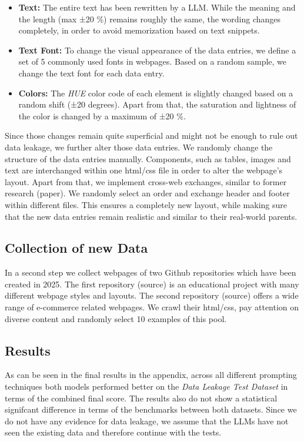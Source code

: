 \begin{itemize}
  \item \textbf{Text:} The entire text has been rewritten by a LLM. While the meaning
    and the length (max ±20 \%) remains roughly the same, the wording changes
    completely, in order to avoid memorization based on text snippets.
  \item \textbf{Text Font:} To change the visual appearance of the data entries, we 
    define a set of 5 commonly used fonts in webpages. Based on a random sample, we 
    change the text font for each data entry.
  \item \textbf{Colors:} The \textit{HUE} color code of each element is slightly
    changed based on a random shift (±20 degrees). Apart from that, the saturation
    and lightness of the color is changed by a maximum of ±20 \%.
\end{itemize}

Since those changes remain quite superficial and might not be enough to rule out 
data leakage, we further alter those data entries. We randomly change the structure 
of the data entries manually. Components, such as tables, images and text are 
interchanged within one html/css file in order to alter the webpage's layout.
Apart from that, we implement cross-web exchanges, similar to former research (paper).
We randomly select an order and exchange header and footer within different files. 
This ensures a completely new layout, while making sure that the new data entries 
remain realistic and similar to their real-world parents.

\subsection{Collection of new Data}
In a second step we collect webpages of two Github repositories which have been 
created in 2025. The first repository (source) is an educational project 
with many different webpage styles and layouts. The second repository (source)
offers a wide range of e-commerce related webpages. \newline
We crawl their html/css, pay attention on diverse content and randomly select
10 examples of this pool.


\subsection{Results}
As can be seen in the final results in the appendix, across 
all different prompting techniques both models performed better on the 
\textit{Data Leakage Test Dataset} in terms of the combined final score.
The results also do not show a statistical 
signifcant difference in terms of the benchmarks between both datasets.
Since we do not have any evidence for data leakage, 
we assume that the LLMs have not seen the existing data and therefore continue 
with the tests.


